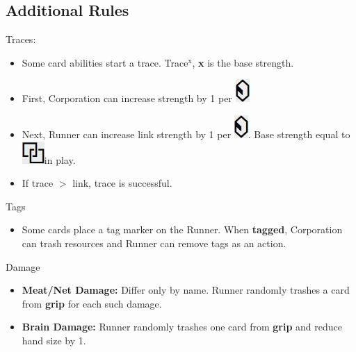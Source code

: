 \documentclass[12pt]{article}
\newenvironment{itemizeCustom}
{\begin{itemize}
  \setlength{\itemsep}{1pt}
  \setlength{\parskip}{0pt}
  \setlength{\parsep}{0pt}}
{\end{itemize}}
\newcommand{\credit}{\includegraphics[scale=0.40]{images/creditLarge.jpg}\hspace{0.3em}}
\newcommand{\link}{\includegraphics[scale=0.40]{images/linkLarge.jpg}\hspace{0.3em}}
\begin{document}
\begin{multicols*}{2}
\section*{Additional Rules}
Traces:
\begin{itemizeCustom}
	\item Some card abilities start a trace. Trace$^{\textrm{x}}$, \textbf{x} is the base strength.
	\item First, Corporation can increase strength by 1 per \credit
	\item Next, Runner can increase link strength by 1 per \credit. Base strength equal to \link in play.
	\item If trace $>$ link, trace is successful. 
\end{itemizeCustom}

Tags
\begin{itemizeCustom}
	\item Some cards place a tag marker on the Runner. When \textbf{tagged}, Corporation can trash resources and Runner can remove tags as an action.
\end{itemizeCustom}

Damage
\begin{itemizeCustom}
	\item \textbf{Meat/Net Damage:} Differ only by name. Runner randomly trashes a card from \textbf{grip} for each such damage.
	\item \textbf{Brain Damage:} Runner randomly trashes one card from \textbf{grip} and reduce hand size by 1.
\end{itemizeCustom}

\end{multicols*}
\end{document}
